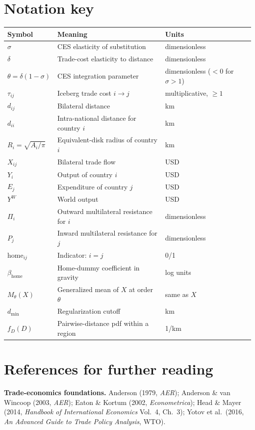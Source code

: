 \documentclass[11pt,letterpaper,oneside]{book}
\theoremstyle{definition}
\theoremstyle{remark}
\begin{document}
\chapter{Notation key}

\begin{small}
\begin{tabular}{lll}
\toprule
Symbol & Meaning & Units \\
\midrule
$\sigma$ & CES elasticity of substitution & dimensionless \\
$\delta$ & Trade-cost elasticity to distance & dimensionless \\
$\theta = \delta(1-\sigma)$ & CES integration parameter & dimensionless ($<0$ for $\sigma>1$) \\
$\tau_{ij}$ & Iceberg trade cost $i \to j$ & multiplicative, $\geq 1$ \\
$d_{ij}$ & Bilateral distance & km \\
$d_{ii}$ & Intra-national distance for country $i$ & km \\
$R_i = \sqrt{A_i/\pi}$ & Equivalent-disk radius of country $i$ & km \\
$X_{ij}$ & Bilateral trade flow & USD \\
$Y_i$ & Output of country $i$ & USD \\
$E_j$ & Expenditure of country $j$ & USD \\
$Y^W$ & World output & USD \\
$\Pi_i$ & Outward multilateral resistance for $i$ & dimensionless \\
$P_j$ & Inward multilateral resistance for $j$ & dimensionless \\
$\text{home}_{ij}$ & Indicator: $i = j$ & 0/1 \\
$\beta_{\text{home}}$ & Home-dummy coefficient in gravity & log units \\
$M_\theta(X)$ & Generalized mean of $X$ at order $\theta$ & same as $X$ \\
$d_{\min}$ & Regularization cutoff & km \\
$f_D(D)$ & Pairwise-distance pdf within a region & 1/km \\
\bottomrule
\end{tabular}
\end{small}

\chapter{References for further reading}

\textbf{Trade-economics foundations.}
Anderson (1979, \emph{AER});
Anderson \& van Wincoop (2003, \emph{AER});
Eaton \& Kortum (2002, \emph{Econometrica});
Head \& Mayer (2014, \emph{Handbook of International Economics} Vol.~4, Ch.~3);
Yotov et al.\ (2016, \emph{An Advanced Guide to Trade Policy Analysis}, WTO).
\end{document}
